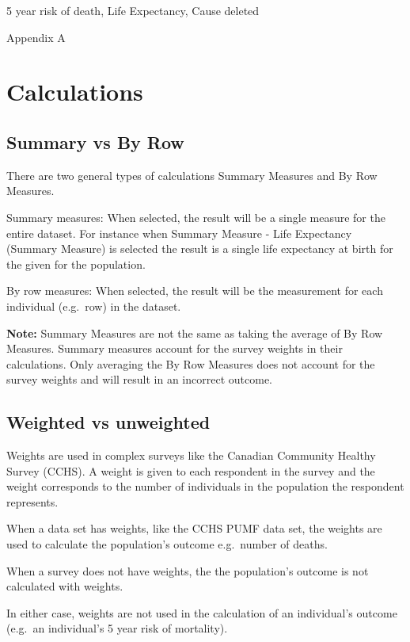 \documentclass[]{book}
\begin{document}
5 year risk of death, Life Expectancy, Cause deleted

Appendix A

\hypertarget{calculations}{%
\section{Calculations}\label{calculations}}

\hypertarget{summary-vs-by-row}{%
\subsection{Summary vs By Row}\label{summary-vs-by-row}}

There are two general types of calculations Summary Measures and By Row Measures.

Summary measures: When selected, the result will be a single measure for the entire dataset. For instance when Summary Measure - Life Expectancy (Summary Measure) is selected the result is a single life expectancy at birth for the given for the population.

By row measures: When selected, the result will be the measurement for each individual (e.g.~row) in the dataset.

\textbf{Note:} Summary Measures are not the same as taking the average of By Row Measures. Summary measures account for the survey weights in their calculations. Only averaging the By Row Measures does not account for the survey weights and will result in an incorrect outcome.

\hypertarget{weighted-vs-unweighted}{%
\subsection{Weighted vs unweighted}\label{weighted-vs-unweighted}}

Weights are used in complex surveys like the Canadian Community Healthy Survey (CCHS). A weight is given to each respondent in the survey and the weight corresponds to the number of individuals in the population the respondent represents.

When a data set has weights, like the CCHS PUMF data set, the weights are used to calculate the population's outcome e.g.~number of deaths.

When a survey does not have weights, the the population's outcome is not calculated with weights.

In either case, weights are not used in the calculation of an individual's outcome (e.g.~an individual's 5 year risk of mortality).
\end{document}
